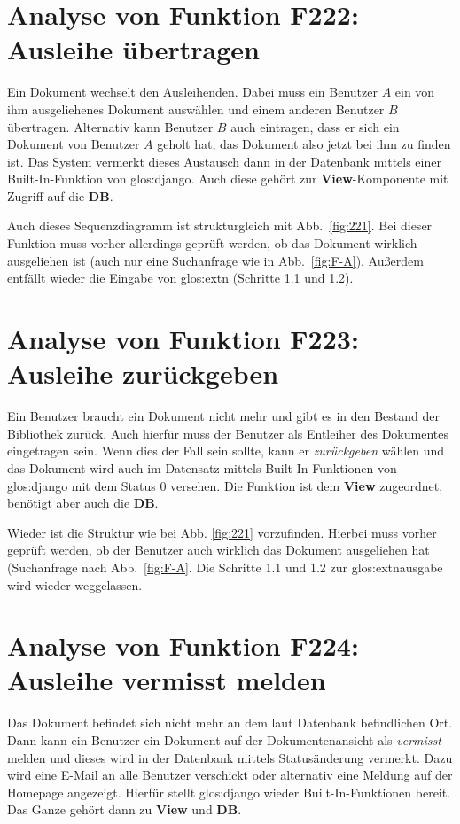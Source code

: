 \section{Analyse von Funktion F222: Ausleihe übertragen}
\label{f:222}
Ein Dokument wechselt den Ausleihenden. Dabei muss ein Benutzer $A$ ein von ihm 
ausgeliehenes Dokument auswählen und einem anderen Benutzer $B$ übertragen. 
Alternativ kann Benutzer $B$ auch eintragen, dass er sich ein Dokument von 
Benutzer $A$ geholt hat, das Dokument also jetzt bei ihm zu finden ist. Das 
System vermerkt dieses Austausch dann in der Datenbank mittels einer 
Built-In-Funktion von \gls{glos:django}. Auch diese gehört zur 
\textbf{View}-Komponente mit Zugriff auf die \textbf{DB}.

Auch dieses Sequenzdiagramm ist strukturgleich mit Abb.\ \ref{fig:221}. Bei 
dieser Funktion muss vorher allerdings geprüft werden, ob das Dokument wirklich 
ausgeliehen ist (auch nur eine Suchanfrage wie in Abb.\ \ref{fig:F-A}). Außerdem 
entfällt wieder die Eingabe von \gls{glos:ext}n (Schritte 1.1 und 1.2).

\section{Analyse von Funktion F223: Ausleihe zurückgeben}
\label{f:223}
Ein Benutzer braucht ein Dokument nicht mehr und gibt es in den Bestand der 
Bibliothek zurück. Auch hierfür muss der Benutzer als Entleiher des Dokumentes 
eingetragen sein. Wenn dies der Fall sein sollte, kann er \emph{zurückgeben} 
wählen und das Dokument wird auch im Datensatz mittels Built-In-Funktionen von 
\gls{glos:django} mit dem Status 0 versehen. Die Funktion ist dem \textbf{View} 
zugeordnet, benötigt aber auch die \textbf{DB}.

Wieder ist die Struktur wie bei Abb. \ref{fig:221} vorzufinden. Hierbei muss 
vorher geprüft werden, ob der Benutzer auch wirklich das Dokument ausgeliehen 
hat (Suchanfrage nach Abb.\ \ref{fig:F-A}. Die Schritte 1.1 und 1.2 zur 
\gls{glos:ext}nausgabe wird wieder weggelassen.

\section{Analyse von Funktion F224: Ausleihe vermisst melden}
\label{f:224}
Das Dokument befindet sich nicht mehr an dem laut Datenbank befindlichen Ort. 
Dann kann ein Benutzer ein Dokument auf der Dokumentenansicht als 
\emph{vermisst} melden und dieses wird in der Datenbank mittels Statusänderung 
vermerkt. Dazu wird eine E-Mail an alle Benutzer verschickt oder alternativ eine
Meldung auf der Homepage angezeigt. Hierfür stellt \gls{glos:django} wieder 
Built-In-Funktionen bereit. Das Ganze gehört dann zu \textbf{View} und 
\textbf{DB}.

